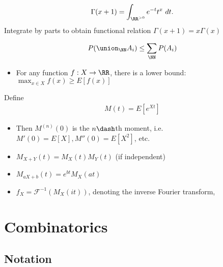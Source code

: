 \begin{definition}

\begin{align*}  
\Gamma(x+1) = \int_{\RR^{>0}} e^{-t} t^x ~dt
.\end{align*} Integrate by parts to obtain functional relation
\(\Gamma(x+1) = x\Gamma(x)\)

\end{definition}

\begin{proposition}

\begin{align*}
P(\union_\NN A_i) \leq \sum_\NN P(A_i)
\end{align*}

\end{proposition}

\begin{itemize}
\tightlist
\item
  For any function \(f:X \to \RR\), there is a lower bound:
  \(\max_{x\in X}f(x) \geq E[f(x)]\)
\end{itemize}

\begin{definition}

Define
\begin{align*}
M(t) = E[e^{Xt}]
\end{align*}

\begin{itemize}
\tightlist
\item
  Then \(M^{(n)}(0)\) is the \(n\dash\)th moment,
  i.e.~\(M'(0) = E[X], M''(0) = E[X^2]\), etc.
\item
  \(M_{X+Y}(t) = M_X(t)M_Y(t)\) (if independent)
\item
  \(M_{aX + b}(t) = e^{bt} M_X(at)\)
\item
  \(f_X = \mathcal{F}^{-1}(M_X(it))\), denoting the inverse Fourier
  transform,
\end{itemize}

\end{definition}

\hypertarget{combinatorics}{%
\section{Combinatorics}\label{combinatorics}}

\hypertarget{notation-4}{%
\subsection{Notation}\label{notation-4}}

